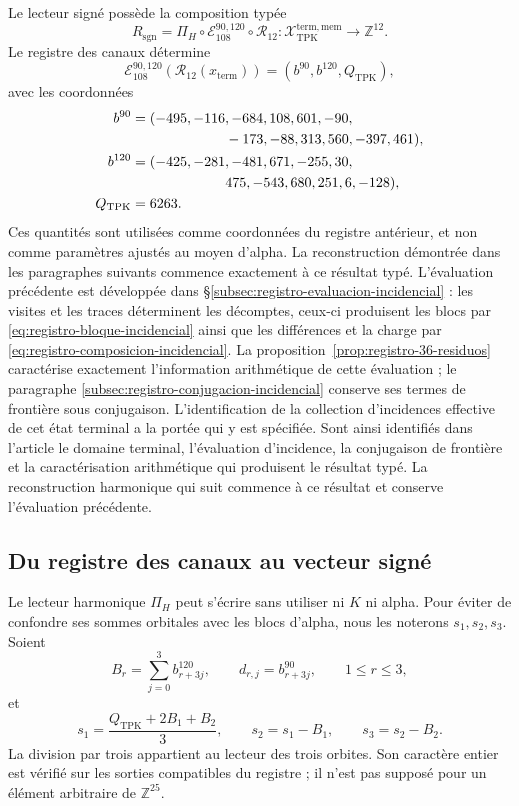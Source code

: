 Le lecteur signé possède la composition typée
\begin{equation}
 R_{\mathrm{sgn}}
 =\Pi_H\circ\mathcal E_{108}^{90,120}\circ\mathcal R_{12}:
 \mathcal X_{\mathrm{TPK}}^{\mathrm{term,mem}}
 \longrightarrow\mathbb Z^{12}.
 \label{eq:k-lector-firmado}
\end{equation}
Le registre des canaux détermine
\[
 \mathcal E_{108}^{90,120}(\mathcal R_{12}(x_{\mathrm{term}}))
 =(b^{90},b^{120},Q_{\mathrm{TPK}}),
\]
avec les coordonnées
\begin{align*}
 b^{90}={}&(-495,-116,-684,108,601,-90,\\
            &\hspace{19mm}-173,-88,313,560,-397,461),\\
 b^{120}={}&(-425,-281,-481,671,-255,30,\\
             &\hspace{19mm}475,-543,680,251,6,-128),\\
 Q_{\mathrm{TPK}}={}&6263.
\end{align*}
Ces quantités sont utilisées comme coordonnées du registre antérieur, et non comme paramètres ajustés au moyen d'alpha. La reconstruction démontrée dans les paragraphes suivants commence exactement à ce résultat typé. L'évaluation précédente est développée dans \S\ref{subsec:registro-evaluacion-incidencial} : les visites et les traces déterminent les décomptes, ceux-ci produisent les blocs par \eqref{eq:registro-bloque-incidencial} ainsi que les différences et la charge par \eqref{eq:registro-composicion-incidencial}. La proposition~\ref{prop:registro-36-residuos} caractérise exactement l'information arithmétique de cette évaluation ; le paragraphe \ref{subsec:registro-conjugacion-incidencial} conserve ses termes de frontière sous conjugaison. L'identification de la collection d'incidences effective de cet état terminal a la portée qui y est spécifiée. Sont ainsi identifiés dans l'article le domaine terminal, l'évaluation d'incidence, la conjugaison de frontière et la caractérisation arithmétique qui produisent le résultat typé. La reconstruction harmonique qui suit commence à ce résultat et conserve l'évaluation précédente.

\subsection{Du registre des canaux au vecteur signé}
\label{subsec:k-pi-h}

Le lecteur harmonique \(\Pi_H\) peut s'écrire sans utiliser ni \(K\) ni
alpha. Pour éviter de confondre ses sommes orbitales avec les blocs d'alpha,
nous les noterons \(s_1,s_2,s_3\). Soient
\[
 B_r=\sum_{j=0}^{3}b^{120}_{r+3j},\qquad
 d_{r,j}=b^{90}_{r+3j},\qquad1\leq r\leq3,
\]
et
\begin{equation}
 s_1=\frac{Q_{\mathrm{TPK}}+2B_1+B_2}{3},\qquad
 s_2=s_1-B_1,\qquad s_3=s_2-B_2.
 \label{eq:k-sumas-armonicas}
\end{equation}
La division par trois appartient au lecteur des trois orbites. Son caractère entier est vérifié sur les sorties compatibles du registre ; il n'est pas supposé pour un élément arbitraire de \(\mathbb Z^{25}\).

